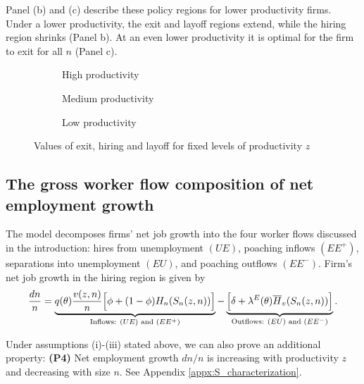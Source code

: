 Panel (b) and (c) describe these policy regions for lower productivity firms.
Under a lower productivity, the exit and layoff regions extend, while the hiring region shrinks (Panel b).
At an even lower productivity it is optimal for the firm to exit for all $n$ (Panel c).

\begin{figure}[ttt]
\begin{center}
\begin{subfigure}{0.30\textwidth}
\scalebox{0.75}{}
\caption{High productivity}
\end{subfigure}
\begin{subfigure}{0.30\textwidth}
\scalebox{0.75}{}
\caption{Medium productivity}
\end{subfigure}
\begin{subfigure}{0.30\textwidth}
\scalebox{0.75}{}
\caption{Low productivity}
\end{subfigure}
\caption{Values of exit, hiring and layoff for fixed levels of productivity $z$}\label{fig:CompStat1}
\end{center}
\end{figure}

\subsection{The gross worker flow composition of net employment growth}
\label{sec:worker_reall}
The model decomposes firms' net job growth into the four worker flows discussed in the introduction: hires from unemployment $(UE)$, poaching inflows $(EE^{+})$, separations into unemployment $(EU)$, and poaching outflows $(EE^{-})$.
Firm's net job growth in the hiring region is given by
\vspace*{-.3cm}
\begin{equation}\label{eq:growth_decomp}
\frac{dn}{n} = \underbrace{\Big.q(\theta)\frac{v(z,n)}{n}\Big[\phi +
(1-\phi)H_n(S_n(z,n))\Big]}_{\text{Inflows: }(UE)\text{ and }(EE^{+})} - \underbrace{\Big.\Big[\delta +
\lambda^E(\theta)\overline{H}_v(S_n(z,n))\Big]}_{\text{Outflows: }(EU)\text{ and }(EE^{-})}.
\vspace*{-.3cm}
\end{equation}\medskip

Under assumptions (i)-(iii) stated above, we can also prove an additional property: \textbf{(P4)}
Net employment growth $dn/n$ is increasing with productivity $z$ and decreasing with size $n$.
See Appendix \ref{appx:S_characterization}.

